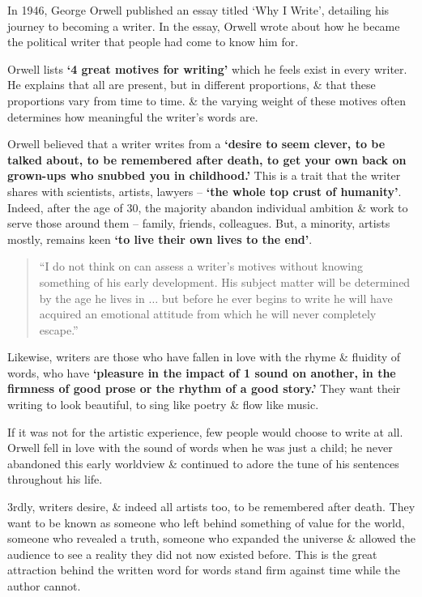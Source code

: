 \documentclass[oneside]{book}
\numberwithin{equation}{section}
\begin{document}
In 1946, George Orwell published an essay titled `Why I Write', detailing his journey to becoming a writer. In the essay, Orwell wrote about how he became the political writer that people had come to know him for.

Orwell lists \textbf{`4 great motives for writing'} which he feels exist in every writer. He explains that all are present, but in different proportions, \& that these proportions vary from time to time. \& the varying weight of these motives often determines how meaningful the writer's words are.

Orwell believed that a writer writes from a \textbf{`desire to seem clever, to be talked about, to be remembered after death, to get your own back on grown-ups who snubbed you in childhood.'} This is a trait that the writer shares with scientists, artists, lawyers -- \textbf{`the whole top crust of humanity'}. Indeed, after the age of 30, the majority abandon individual ambition \& work to serve those around them -- family, friends, colleagues. But, a minority, artists mostly, remains keen \textbf{`to live their own lives to the end'}.

\begin{quotation}
	``I do not think on can assess a writer's motives without knowing something of his early development. His subject matter will be determined by the age he lives in $\ldots$ but before he ever begins to write he will have acquired an emotional attitude from which he will never completely escape.''
\end{quotation}
Likewise, writers are those who have fallen in love with the rhyme \& fluidity of words, who have \textbf{`pleasure in the impact of 1 sound on another, in the firmness of good prose or the rhythm of a good story.'} They want their writing to look beautiful, to sing like poetry \& flow like music.

If it was not for the artistic experience, few people would choose to write at all. Orwell fell in love with the sound of words when he was just a child; he never abandoned this early worldview \& continued to adore the tune of his sentences throughout his life.

3rdly, writers desire, \& indeed all artists too, to be remembered after death. They want to be known as someone who left behind something of value for the world, someone who revealed a truth, someone who expanded the universe \& allowed the audience to see a reality they did not now existed before. This is the great attraction behind the written word for words stand firm against time while the author cannot.
\end{document}
